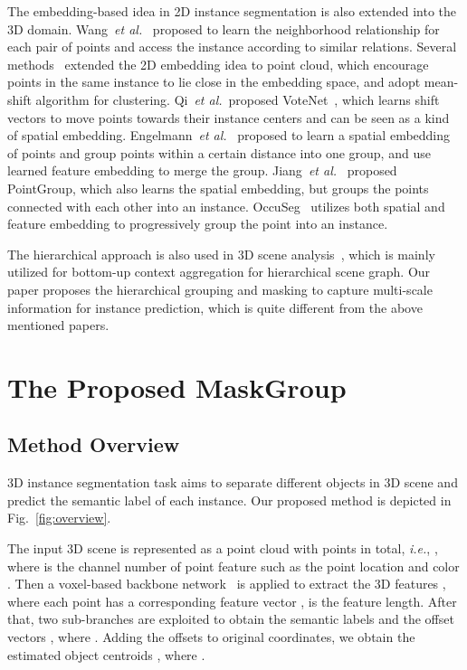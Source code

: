 \documentclass{article}
\newcommand{\etal}{\emph{et al.}}
\newcommand{\ie}{\emph{i.e.}}
\begin{document}
The embedding-based idea in 2D instance segmentation is also extended into the 3D domain.
Wang~\etal~\cite{sgpn} proposed to learn the neighborhood relationship for each pair of points and access the instance according to similar relations.
Several methods~\cite{jsis3d,asis} extended the 2D embedding idea to point cloud, which encourage points in the same instance to lie close in the embedding space, and adopt mean-shift algorithm for clustering.
Qi~\etal~proposed VoteNet~\cite{votenet}, which learns shift vectors to move points towards their instance centers and can be seen as a kind of spatial embedding.
Engelmann~\etal~\cite{3dmpa} proposed to learn a spatial embedding of points and group points within a certain distance into one group, and use learned feature embedding to merge the group.
Jiang~\etal~\cite{pointgroup} proposed PointGroup, which also learns the spatial embedding, but groups the points connected with each other into an instance.
OccuSeg~\cite{occseg} utilizes both spatial and feature embedding to progressively group the point into an instance.

{The hierarchical approach is also used in 3D scene analysis~\cite{shi2019hierarchy,armeni20193d}, which is mainly utilized for bottom-up context aggregation for hierarchical scene graph.  Our paper proposes the hierarchical grouping and masking to capture multi-scale information for instance prediction, which is quite different from the above mentioned papers.}
\section{The Proposed MaskGroup}


\subsection{Method Overview}


3D instance segmentation task aims to separate different objects in 3D scene and predict the semantic label of each instance. Our proposed method is depicted in Fig.~\ref{fig:overview}.

The input 3D scene is represented as a point cloud  with  points in total, \ie, , where  is the  channel number of point feature such as the point location   and color . 
Then a voxel-based backbone network~\cite{sparse3d} is applied to extract the 3D features , where each point  has a corresponding feature vector ,   is the feature length.
After that, two sub-branches are exploited to obtain the semantic labels  and the offset vectors , where . 
Adding the offsets to original coordinates, we obtain the estimated object centroids , where .
\end{document}
